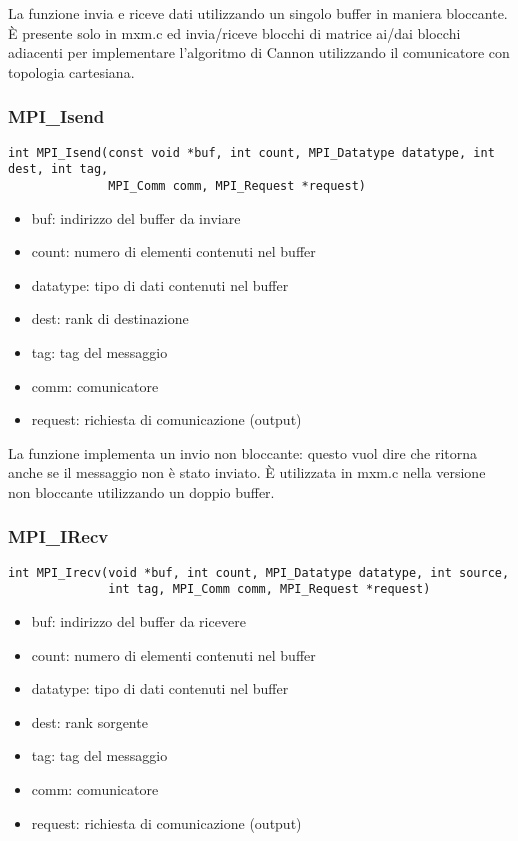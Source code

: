 La funzione invia e riceve dati utilizzando un singolo buffer in maniera bloccante. \`{E} presente solo in mxm.c ed invia/riceve blocchi di matrice ai/dai blocchi adiacenti per implementare l'algoritmo di Cannon utilizzando il comunicatore con topologia cartesiana.

\subsubsection{MPI\_Isend}
\begin{lstlisting}
int MPI_Isend(const void *buf, int count, MPI_Datatype datatype, int dest, int tag,
              MPI_Comm comm, MPI_Request *request)
\end{lstlisting}
\begin{itemize}
  \item buf: indirizzo del buffer da inviare
  \item count: numero di elementi contenuti nel buffer
  \item datatype: tipo di dati contenuti nel buffer
  \item dest: rank di destinazione
  \item tag: tag del messaggio
  \item comm: comunicatore
  \item request: richiesta di comunicazione (output)
\end{itemize}

La funzione implementa un invio non bloccante: questo vuol dire che ritorna anche se il messaggio non \`{e} stato inviato. \`{E} utilizzata in mxm.c nella versione non bloccante utilizzando un doppio buffer.

\subsubsection{MPI\_IRecv}
\begin{lstlisting}
int MPI_Irecv(void *buf, int count, MPI_Datatype datatype, int source,
              int tag, MPI_Comm comm, MPI_Request *request)
\end{lstlisting}
\begin{itemize}
  \item buf: indirizzo del buffer da ricevere
  \item count: numero di elementi contenuti nel buffer
  \item datatype: tipo di dati contenuti nel buffer
  \item dest: rank sorgente
  \item tag: tag del messaggio
  \item comm: comunicatore
  \item request: richiesta di comunicazione (output)
\end{itemize}

